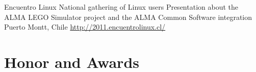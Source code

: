 \documentclass[11pt,a4paper,sans]{moderncv}
\begin{document}
        {Encuentro Linux}
        {National gathering of Linux users}
        {Presentation about the ALMA LEGO Simulator project and the ALMA Common Software integration}
        {Puerto Montt, Chile}
        {\url{http://2011.encuentrolinux.cl/}}

\section{Honor and Awards}

\end{document}
